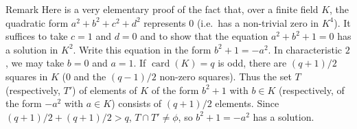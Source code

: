 \begin{statement}{Remark}
Here is a very elementary proof of the fact that, over a finite field $K$,
the quadratic form $a^{2}+b^{2}+c^{2}+d^{2}$ represents $0$ (i.e.\ has a
non-trivial zero in $K^{4}$). It suffices to take $c=1$ and $d=0$ and to
show that the equation $a^{2}+b^{2}+1=0$ has a solution in $K^{2}$. Write
this equation in the form $b^{2}+1=-a^{2}$. In characteristic $2$, we may
take $b=0$ and $a=1$. If $\operatorname{card}(K)=q$ is odd, there are
$(q+1)/2$ squares in $K$ ($0$ and the $(q-1)/2$ non-zero squares). Thus the
set $T$ (respectively, $T'$) of elements of $K$ of the form $b^{2}+1$ with
$b\in K$ (respectively, of the form $-a^{2}$ with $a\in K$) consists of
$(q+1)/2$ elements. Since $(q+1)/2+(q+1)/2>q$, $T\cap T'\neq\phi$, so
$b^{2}+1=-a^{2}$ has a solution.
\end{statement}
